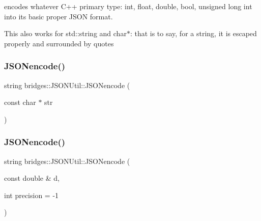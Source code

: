 encodes whatever C++ primary type\+: int, float, double, bool, unsigned long int into its basic proper J\+S\+ON format.

This also works for std\+::string and char$\ast$\+: that is to say, for a string, it is escaped properly and surrounded by quotes \mbox{\label{namespacebridges_1_1_j_s_o_n_util_a8167097b34730f71a1b395a76eecd550}} 
\subsubsection{\texorpdfstring{JSONencode()}{JSONencode()}\hspace{0.1cm}{\footnotesize\ttfamily [2/4]}}
{\footnotesize\ttfamily string bridges\+::\+J\+S\+O\+N\+Util\+::\+J\+S\+O\+Nencode (\begin{DoxyParamCaption}\item[{const char $\ast$}]{str }\end{DoxyParamCaption})\hspace{0.3cm}{\ttfamily [inline]}}

\mbox{\label{namespacebridges_1_1_j_s_o_n_util_a3ba781fbae468d93158efbdf3492149c}} 
\subsubsection{\texorpdfstring{JSONencode()}{JSONencode()}\hspace{0.1cm}{\footnotesize\ttfamily [3/4]}}
{\footnotesize\ttfamily string bridges\+::\+J\+S\+O\+N\+Util\+::\+J\+S\+O\+Nencode (\begin{DoxyParamCaption}\item[{const double \&}]{d,  }\item[{int}]{precision = {\ttfamily -\/1} }\end{DoxyParamCaption})\hspace{0.3cm}{\ttfamily [inline]}}

\mbox{\label{namespacebridges_1_1_j_s_o_n_util_a8372aa47b00ae65edbe27747c98d106a}} 
